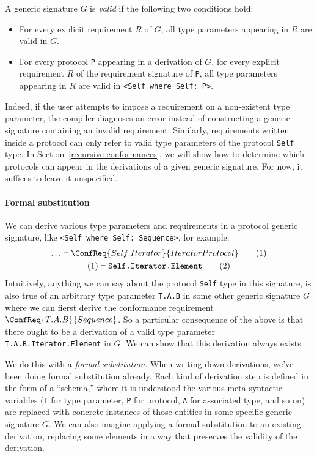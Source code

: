 \documentclass[../generics]{subfiles}
\begin{document}
\begin{definition}\label{valid generic signature def}
A generic signature $G$ is \emph{valid} if the following two conditions hold:
\begin{itemize}
\item For every explicit requirement $R$ of $G$, all type parameters appearing in $R$ are valid in $G$.
\item For every protocol \texttt{P} appearing in a derivation of $G$, for every explicit requirement $R$ of the requirement signature of \texttt{P}, all type parameters appearing in $R$ are valid in \verb|<Self where Self: P>|.
\end{itemize}
\end{definition}
Indeed, if the user attempts to impose a requirement on a non-existent type parameter, the compiler diagnoses an error instead of constructing a generic signature containing an invalid requirement. Similarly, requirements written inside a protocol can only refer to valid type parameters of the protocol \texttt{Self} type. In Section~\ref{recursive conformances}, we will show how to determine which protocols can appear in the derivations of a given generic signature. For now, it suffices to leave it unspecified.

\paragraph{Formal substitution}
We can derive various type parameters and requirements in a protocol generic signature, like \verb|<Self where Self: Sequence>|, for example:
\begin{gather*}
\ldots\vdash \ConfReq{Self.Iterator}{IteratorProtocol}\tag{1}\\
(1)\vdash \texttt{Self.Iterator.Element}\tag{2}
\end{gather*}
Intuitively, anything we can say about the protocol \texttt{Self} type in this signature, is also true of an arbitrary type parameter \texttt{T.A.B} in some other generic signature $G$ where we can fierst derive the conformance requirement $\ConfReq{T.A.B}{Sequence}$. So a particular consequence of the above is that there ought to be a derivation of a valid type parameter \texttt{T.A.B.Iterator.Element} in $G$. We can show that this derivation always exists.

We do this with a \emph{formal substitution}. When writing down derivations, we've been doing formal substitution already. Each kind of derivation step is defined in the form of a ``schema,'' where it is understood the various meta-syntactic variables (\texttt{T} for type parameter, \texttt{P} for protocol, \texttt{A} for associated type, and so on) are replaced with concrete instances of those entities in some specific generic signature $G$. We can also imagine applying a formal substitution to an existing derivation, replacing some elements in a way that preserves the validity of the derivation.
\end{document}
